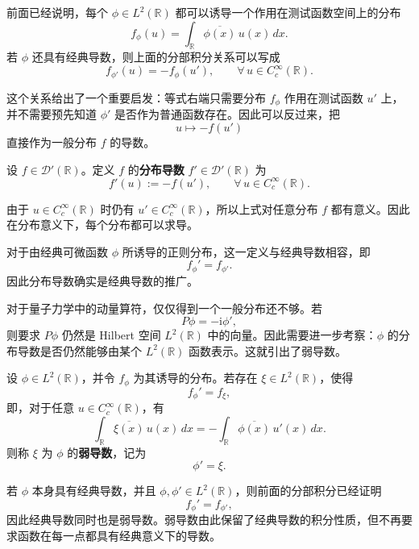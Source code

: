 \documentclass[UTF8,a4paper,11pt,openany]{ctexbook}
\begin{document}
前面已经说明，每个 $\phi\in L^2(\mathbb R)$ 都可以诱导一个作用在测试函数空间上的分布
\[
f_\phi(u)
=
\int_{\mathbb R}
\overline{\phi(x)}\,u(x)\,dx.
\]
若 $\phi$ 还具有经典导数，则上面的分部积分关系可以写成
\begin{equation}
    f_{\phi'}(u)
    =
    -f_\phi(u'),
    \qquad
    \forall\,u\in C_c^\infty(\mathbb R).
\end{equation}

这个关系给出了一个重要启发：等式右端只需要分布 $f_\phi$ 作用在测试函数 $u'$ 上，并不需要预先知道 $\phi'$ 是否作为普通函数存在。因此可以反过来，把
\[
u\longmapsto -f(u')
\]
直接作为一般分布 $f$ 的导数。

\begin{definition}[分布导数]
设 $f\in\mathcal D'(\mathbb R)$。定义 $f$ 的\textbf{分布导数} $f'\in\mathcal D'(\mathbb R)$ 为
\begin{equation}
    f'(u)
    :=
    -f(u'),
    \qquad
    \forall\,u\in C_c^\infty(\mathbb R).
\end{equation}
\end{definition}

由于 $u\in C_c^\infty(\mathbb R)$ 时仍有 $u'\in C_c^\infty(\mathbb R)$，所以上式对任意分布 $f$ 都有意义。因此在分布意义下，每个分布都可以求导。

对于由经典可微函数 $\phi$ 所诱导的正则分布，这一定义与经典导数相容，即
\[
f_\phi'
=
f_{\phi'}.
\]
因此分布导数确实是经典导数的推广。

对于量子力学中的动量算符，仅仅得到一个一般分布还不够。若
\[
P\phi=-\mathrm{i}\phi',
\]
则要求 $P\phi$ 仍然是 Hilbert 空间 $L^2(\mathbb R)$ 中的向量。因此需要进一步考察：$\phi$ 的分布导数是否仍然能够由某个 $L^2(\mathbb R)$ 函数表示。这就引出了弱导数。

\begin{definition}[弱导数]
设 $\phi\in L^2(\mathbb R)$，并令 $f_\phi$ 为其诱导的分布。若存在 $\xi\in L^2(\mathbb R)$，使得
\begin{equation}
    f_\phi'
    =
    f_\xi,
\end{equation}
即，对于任意 $u\in C_c^\infty(\mathbb R)$，有
\begin{equation}
    \int_{\mathbb R}
    \overline{\xi(x)}\,u(x)\,dx
    =
    -
    \int_{\mathbb R}
    \overline{\phi(x)}\,u'(x)\,dx.
\end{equation}
则称 $\xi$ 为 $\phi$ 的\textbf{弱导数}，记为
\[
\phi'=\xi.
\]
\end{definition}

若 $\phi$ 本身具有经典导数，并且 $\phi,\phi'\in L^2(\mathbb R)$，则前面的分部积分已经证明
\[
f_\phi'=f_{\phi'},
\]
因此经典导数同时也是弱导数。弱导数由此保留了经典导数的积分性质，但不再要求函数在每一点都具有经典意义下的导数。
\end{document}
